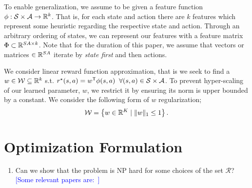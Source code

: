 \documentclass[10pt]{article}
\renewcommand{\cite}{\citep}
\newcommand{\mm}[1]{\textcolor{blue}{[#1]}}
\begin{document}
To enable generalization, we assume to be given a feature function $\phi: \mathcal{S} \times \mathcal{A}\to \mathbb{R}^k$. That is, for each state and action there are $k$ features which represent some heuristic regarding the respective state and action. Through an arbitrary ordering of states, we can represent our features with a feature matrix $\Phi \subset \mathbb{R}^{SA\times k}$. Note that for the duration of this paper, we assume that vectors or matrices $\in \mathbb{R}^{SA}$ iterate by \emph{state first} and then actions.

We consider linear reward function approximation, that is we seek to find a $w \in \mathcal{W} \subseteq \mathbb{R}^k$ s.t. $r^{\mathnormal{\star}}(s, a) = w^{\mathsf{T}}
	\phi(s,a) \;\; \forall (s,a) \in \mathcal{S}\times\mathcal{A}$. To
prevent hyper-scaling of our learned parameter, $w$, we restrict it by
ensuring its norm is upper bounded by a constant. We consider the following
form of $w$ regularization;
\[
  \mathcal{W} = \left\{ w \in \mathbb{R}^K
    \mid \| w \|_1 \le 1 \right\}.
\]




\section{Optimization Formulation}\label{sec:optimization-formulation}
\begin{enumerate}
	\item Can we show that the problem is NP hard for some choices of the set $\mathcal{R}$? \mm{Some relevant papers are:~\cite{Wu2013,Eldar2008}}
\end{enumerate}
\end{document}

